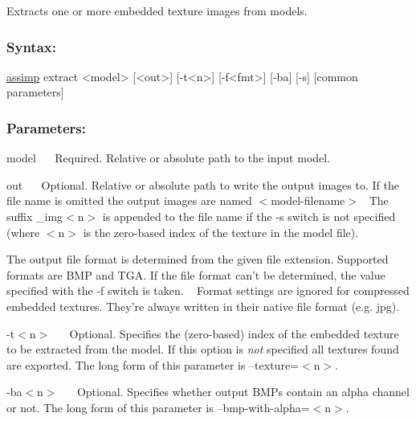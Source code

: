 Extracts one or more embedded texture images from models.

\subsubsection*{Syntax\+:}


\begin{DoxyCode}
\hyperlink{namespaceassimp}{assimp} extract <model> [<out>] [-t<n>] [-f<fmt>] [-ba] [-s] [common parameters]
\end{DoxyCode}


\subsubsection*{Parameters\+:}

{\ttfamily  model~\newline
}~\newline
 Required. Relative or absolute path to the input model. 

{\ttfamily  out~\newline
}~\newline
 Optional. Relative or absolute path to write the output images to. If the file name is omitted the output images are named {\ttfamily $<$model-\/filename$>$}~\newline
 The suffix {\ttfamily \+\_\+img$<$n$>$} is appended to the file name if the -\/s switch is not specified (where {\ttfamily $<$n$>$} is the zero-\/based index of the texture in the model file).~\newline


The output file format is determined from the given file extension. Supported formats are B\+M\+P and T\+G\+A. If the file format can't be determined, the value specified with the -\/f switch is taken. ~\newline
 Format settings are ignored for compressed embedded textures. They're always written in their native file format (e.\+g. jpg). 

{\ttfamily -\/t$<$n$>$~\newline
 }~\newline
 Optional. Specifies the (zero-\/based) index of the embedded texture to be extracted from the model. If this option is {\itshape not} specified all textures found are exported. The long form of this parameter is {\ttfamily --texture=$<$n$>$}. 

{\ttfamily -\/ba$<$n$>$~\newline
 }~\newline
 Optional. Specifies whether output B\+M\+Ps contain an alpha channel or not. The long form of this parameter is {\ttfamily --bmp-\/with-\/alpha=$<$n$>$}. 

